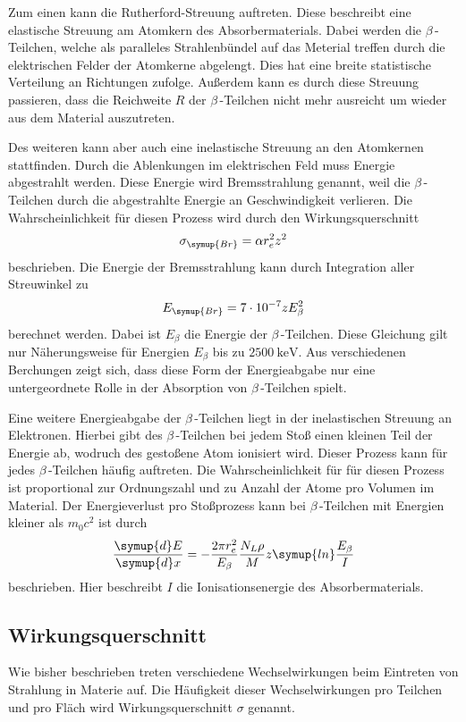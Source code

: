 Zum einen kann die Rutherford-Streuung auftreten. Diese beschreibt eine elastische Streuung am Atomkern des Absorbermaterials. Dabei werden die $\beta$\,-Teilchen, welche 
als paralleles Strahlenbündel auf das Meterial treffen durch die elektrischen Felder der Atomkerne abgelengt. Dies hat eine breite statistische Verteilung an Richtungen 
zufolge. Außerdem kann es durch diese Streuung passieren, dass die Reichweite $R$ der $\beta$\,-Teilchen nicht mehr ausreicht um wieder aus dem Material auszutreten. 


Des weiteren kann aber auch eine inelastische Streuung an den Atomkernen stattfinden. Durch die Ablenkungen im elektrischen Feld muss Energie abgestrahlt werden. Diese 
Energie wird Bremsstrahlung genannt, weil die $\beta$\,-Teilchen durch die abgestrahlte Energie an Geschwindigkeit verlieren. Die Wahrscheinlichkeit für diesen Prozess
wird durch den Wirkungsquerschnitt
\begin{equation*}
    \sigma_{\symup{Br}} = \alpha r_e^2 z^2
\end{equation*}
beschrieben. Die Energie der Bremsstrahlung kann durch Integration aller Streuwinkel zu 
\begin{equation*}
    E_{\symup{Br}} = 7\cdot 10^{-7} z E_\beta^2
\end{equation*}
berechnet werden. Dabei ist $E_\beta$ die Energie der $\beta$\,-Teilchen. Diese Gleichung gilt nur Näherungsweise für Energien $E_\beta$ bis zu $\qty{2500}{\kilo\electronvolt}$. 
Aus verschiedenen Berchungen zeigt sich, dass diese Form der Energieabgabe nur eine untergeordnete Rolle in der Absorption von $\beta$\,-Teilchen spielt.

Eine weitere Energieabgabe der $\beta$\,-Teilchen liegt in der inelastischen Streuung an Elektronen. Hierbei gibt des $\beta$\,-Teilchen bei jedem Stoß einen kleinen Teil der
Energie ab, wodruch des gestoßene Atom ionisiert wird. Dieser Prozess kann für jedes $\beta$\,-Teilchen häufig auftreten. Die Wahrscheinlichkeit für für diesen Prozess
ist proportional zur Ordnungszahl und zu Anzahl der Atome pro Volumen im Material. Der Energieverlust pro Stoßprozess kann bei $\beta$\,-Teilchen mit Energien kleiner als
$m_0 c^2$ ist durch 
\begin{equation}
    \label{eqn:inelast_elek_everlust}
    \frac{\symup{d}E}{\symup{d}x} = -\frac{2\pi r_e^2}{E_\beta}\frac{N_L\rho}{M}z\symup{ln}\frac{E_\beta}{I}
\end{equation}
beschrieben. Hier beschreibt $I$ die Ionisationsenergie des Absorbermaterials.

\subsection{Wirkungsquerschnitt}
\label{subsec:Wirkungsquerschnitt}
Wie bisher beschrieben treten verschiedene Wechselwirkungen beim Eintreten von Strahlung in Materie auf. Die Häufigkeit dieser Wechselwirkungen pro Teilchen und pro Fläch
wird Wirkungsquerschnitt $\sigma$ genannt.
